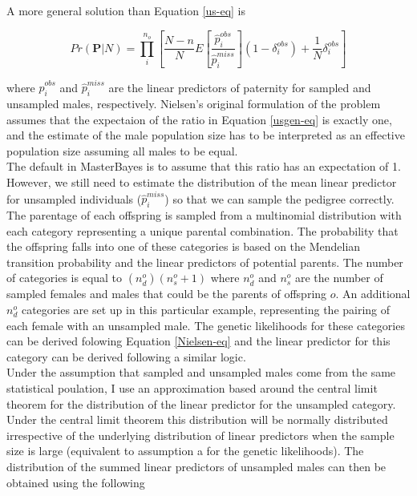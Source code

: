 \documentclass{article}
\begin{document}
A more general solution than Equation \ref{us-eq} is

\begin{equation}
Pr(\bm{P}|N)  = \prod^{n_{o}}_{i}\left[\frac{N-n}{N}E\left[\frac{\hat{p}^{obs}_{i}}{\hat{p}^{miss}_{i}}\right](1-\delta^{obs}_{i})+\frac{1}{N}\delta^{obs}_{i}\right]
\label{usgen-eq}
\end{equation}

where $\hat{p}^{obs}_{i}$ and $\hat{p}^{miss}_{i}$ are the linear predictors of paternity for sampled and unsampled males, respectively.  Nielsen's original formulation of the problem assumes that the expectaion of the ratio in Equation \ref{usgen-eq} is exactly one, and the estimate of the male population size has to be interpreted as an effective population size assuming all males to be equal.\\

The default in MasterBayes is to assume that this ratio has an expectation of 1.  However, we still need to estimate the distribution of the mean linear predictor for unsampled individuals ($\hat{p}^{miss}_{i}$) so that we can sample the pedigree correctly.\\

The parentage of each offspring is sampled from a multinomial distribution with each category representing a unique parental combination.  The probability that the offspring falls into one of these categories is based on the Mendelian transition probability and the linear predictors of potential parents.  The number of categories is equal to $(n^{o}_{d})(n^{o}_{s}+1)$ where $n^{o}_{d}$ and $n^{o}_{s}$ are the number of sampled females and males that could be the parents of offspring $o$.  An additional $n^{o}_{d}$ categories are set up in this particular example, representing the pairing of each female with an unsampled male.  The genetic likelihoods for these categories can be derived folowing Equation \ref{Nielsen-eq} and the linear predictor for this category can be derived following a similar logic.\\   

 Under the assumption that sampled and unsampled males come from the same statistical poulation,  I use an approximation based around the central limit theorem for the distribution of the linear predictor for the unsampled category.  Under the central limit theorem this distribution will be normally distributed irrespective of the underlying distribution of linear predictors when the sample size is large (equivalent to assumption a for the genetic likelihoods).  The distribution of the summed linear predictors of unsampled males can then be obtained using the following
\end{document}
